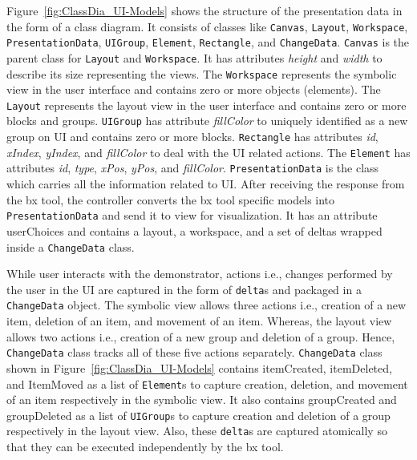 Figure~\ref{fig:ClassDia_UI-Models} shows the structure of the presentation data in the form of a class diagram. It consists of classes like \texttt{Canvas}, \texttt{Layout}, \texttt{Workspace}, \texttt{PresentationData}, \texttt{UIGroup}, \texttt{Element}, \texttt{Rectangle}, and \texttt{ChangeData}. \texttt{Canvas} is the parent class for \texttt{Layout} and \texttt{Workspace}. It has attributes \textit{height} and \textit{width} to describe its size representing the views. The \texttt{Workspace} represents the symbolic view in the user interface and contains zero or more objects (elements). The \texttt{Layout} represents the layout view in the user interface and contains zero or more blocks and groups. \texttt{UIGroup} has attribute \textit{fillColor} to uniquely identified as a new group on UI and contains zero or more blocks. \texttt{Rectangle} has attributes \textit{id}, \textit{xIndex}, \textit{yIndex}, and \textit{fillColor} to deal with the UI related actions. The \texttt{Element} has attributes \textit{id}, \textit{type}, \textit{xPos}, \textit{yPos}, and \textit{fillColor}. \texttt{PresentationData} is the class which carries all the information related to UI. After receiving the response from the bx tool, the controller converts the bx tool specific models into \texttt{PresentationData} and send it to view for visualization. It has an attribute userChoices and contains a layout, a workspace, and a set of deltas wrapped inside a \texttt{ChangeData} class.

While user interacts with the demonstrator, actions i.e., changes performed by the user in the UI are captured in the form of \texttt{delta}s and packaged in a \texttt{ChangeData} object. The symbolic view allows three actions i.e., creation of a new item, deletion of an item, and movement of an item. Whereas, the layout view allows two actions i.e., creation of a new group and deletion of a group. Hence, \texttt{ChangeData} class tracks all of these five actions separately. \texttt{ChangeData} class shown in Figure~\ref{fig:ClassDia_UI-Models} contains itemCreated, itemDeleted, and ItemMoved as a list of \texttt{Element}s to capture creation, deletion, and movement of an item respectively in the symbolic view. It also contains groupCreated and groupDeleted as a list of \texttt{UIGroup}s to capture creation and deletion of a group respectively in the layout view. Also, these \texttt{delta}s are captured atomically so that they can be executed independently by the bx tool.

